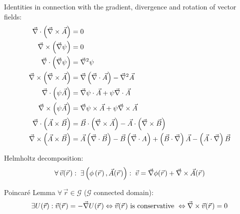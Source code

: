 			\noindent
			Identities in connection with the gradient, divergence and rotation of vector fields:
			\begin{equation}
				\begin{aligned}
					\vec{\nabla}\cdot\left(\vec{\nabla}\times\vec{A}\right) &= 0 \\
					\vec{\nabla}\times\left(\vec{\nabla}\psi\right) &= 0 \\
					\vec{\nabla}\cdot\left(\vec{\nabla}\psi\right) &= \vec{\nabla}^2\psi \\
					\vec{\nabla}\times\left(\vec{\nabla}\times\vec{A}\right) &= \vec{\nabla}\left(\vec{\nabla}\cdot\vec{A}\right) -\vec{\nabla}^2\vec{A} \\
					\vec{\nabla}\cdot\left(\psi\vec{A}\right) &= \vec{\nabla}\psi\cdot\vec{A} + \psi\vec{\nabla}\cdot\vec{A}\\
					\vec{\nabla}\times\left(\psi\vec{A}\right) &= \vec{\nabla}\psi\times\vec{A} + \psi\vec{\nabla}\times\vec{A} \\
					\vec{\nabla}\cdot\left(\vec{A}\times\vec{B}\right) &= \vec{B}\cdot\left(\vec{\nabla}\times\vec{A}\right) - 	\vec{A}\cdot\left(\vec{\nabla}\times\vec{B}\right) \\
					\vec{\nabla}\times\left(\vec{A}\times\vec{B}\right) &= \vec{A}\left(\vec{\nabla}\cdot\vec{B}\right) - \vec{B}\left(\vec{\nabla}\cdot{A}\right) + \left(\vec{B}\cdot\vec{\nabla}\right)\vec{A} - \left(\vec{A}\cdot\vec{\nabla}\right)\vec{B} \\
				\end{aligned}
			\end{equation}

			\noindent
			Helmholtz decomposition:
			\begin{equation}
				\forall \,\vec{v}(\pvec{r}):\; \exists\left(\phi\left(\pvec{r}\right),\vec{A}(\pvec{r})\right):\;\vec{v} = \Nabla\phi(\pvec{r}) + 	\Nabla\times\vec{A}(\pvec{r})
			\end{equation}

			\noindent
			Poincaré Lemma $\forall\, \vec{r}\in\mathcal{G}$ ($\mathcal{G}$ connected domain):
			\begin{equation}
				\exists U(\vec{r}): \vec{v}(\pvec{r}) = -\Nabla U(\pvec{r})
				\Leftrightarrow \vec{v}(\pvec{r}) \text{ is conservative }
				\Leftrightarrow \Nabla\times\vec{v}(\pvec{r}) = 0
			\end{equation}


